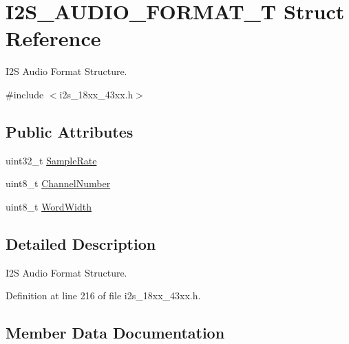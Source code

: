 \hypertarget{struct_i2_s___a_u_d_i_o___f_o_r_m_a_t___t}{}\section{I2\+S\+\_\+\+A\+U\+D\+I\+O\+\_\+\+F\+O\+R\+M\+A\+T\+\_\+T Struct Reference}
\label{struct_i2_s___a_u_d_i_o___f_o_r_m_a_t___t}


I2S Audio Format Structure.  




{\ttfamily \#include $<$i2s\+\_\+18xx\+\_\+43xx.\+h$>$}

\subsection*{Public Attributes}
\begin{DoxyCompactItemize}
\item 
uint32\+\_\+t \hyperlink{struct_i2_s___a_u_d_i_o___f_o_r_m_a_t___t_aef370fad5b70b5226a2f8a780bd934d9}{Sample\+Rate}
\item 
uint8\+\_\+t \hyperlink{struct_i2_s___a_u_d_i_o___f_o_r_m_a_t___t_ad9856c3cfc176a9c5f25851dda4d848d}{Channel\+Number}
\item 
uint8\+\_\+t \hyperlink{struct_i2_s___a_u_d_i_o___f_o_r_m_a_t___t_a5b21d5d739e0eb7e66c898618fcd4605}{Word\+Width}
\end{DoxyCompactItemize}


\subsection{Detailed Description}
I2S Audio Format Structure. 

Definition at line 216 of file i2s\+\_\+18xx\+\_\+43xx.\+h.



\subsection{Member Data Documentation}
\mbox{\label{struct_i2_s___a_u_d_i_o___f_o_r_m_a_t___t_ad9856c3cfc176a9c5f25851dda4d848d}} 
